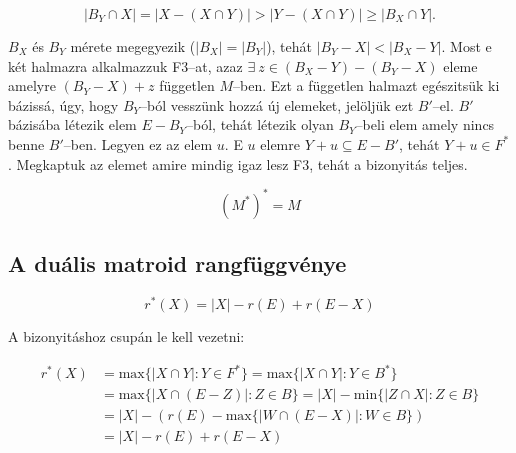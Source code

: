 \[
	|B_Y \cap X | = |X-(X \cap Y)| > |Y - (X \cap Y)| \geq |B_X \cap Y|.
\]

$B_X$ és $B_Y$ mérete megegyezik ($|B_X|=|B_Y|$), tehát $|B_Y-X| < |B_X-Y|$.
Most e két halmazra alkalmazzuk F$3$--at, azaz $\exists~z \in (B_X-Y)-(B_Y-X)$
eleme amelyre $(B_Y-X)+z$ független $M$--ben. Ezt a független halmazt egészitsük
ki bázissá, úgy, hogy $B_Y$--ból vesszünk hozzá új elemeket, jelöljük ezt
$B'$--el. $B'$ bázisába létezik elem $E-B_Y$--ból, tehát létezik olyan $B_Y$--beli elem
amely nincs benne $B'$--ben. Legyen ez az elem $u$. E $u$ elemre $Y+u \subseteq E - B'$,
tehát $Y+u \in F^*$. Megkaptuk az elemet amire mindig igaz lesz F$3$, tehát a bizonyitás
teljes.

\[(M^*)^* = M \]

\subsection{A duális matroid rangfüggvénye}

\[ r^*(X) = |X|-r(E)+r(E-X)\]

A bizonyitáshoz csupán le kell vezetni:

\begin{align*}
	r^*(X) & = \mbox{max} \{ |X \cap Y| : Y \in F^*\}   = \mbox{max} \{ |X \cap Y| : Y \in B^*\}     \\
	       & = \mbox{max} \{ |X \cap (E-Z)| : Z \in B\} = |X| - \mbox{min} \{ |Z \cap X| : Z \in B\} \\
	       & = |X| - (r(E)-\mbox{max}\{|W \cap (E-X)| : W \in B\})                                   \\
	       & = |X| - r(E) + r(E-X)
\end{align*}
